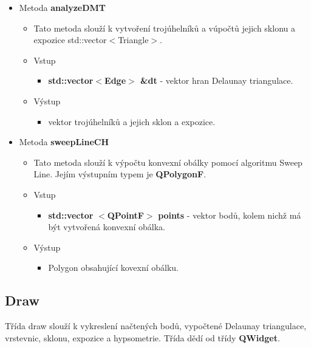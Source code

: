 \documentclass[a4paper, 12pt]{article}
\begin{document}
\begin{itemize}
	\item Metoda \textbf{analyzeDMT}		
\begin{itemize}
	\item Tato metoda slouží k vytvoření trojúhelníků a vúpočtů jejich sklonu a expozice {std::vector$<$Triangle$>$}.
	\item Vstup
	\begin{itemize}
		\item \textbf{std::vector$<$Edge$>$ \&dt} - vektor hran Delaunay triangulace.
	\end{itemize}
	\item Výstup
	\begin{itemize}	
		\item vektor trojúhelníků a jejich sklon a expozice.
	\end{itemize}
\end{itemize}

	\item Metoda \textbf{sweepLineCH}
\begin{itemize}
	\item Tato metoda slouží k výpočtu konvexní obálky pomocí algoritmu Sweep Line. Jejím výstupním typem je \textbf{QPolygonF}.
	\item Vstup
	\begin{itemize}
		\item \textbf{std::vector} $<$\textbf{QPointF}$>$ \textbf{points} - vektor bodů, kolem nichž má být vytvořená konvexní obálka.
	\end{itemize}
	\item Výstup
	\begin{itemize}
		\item Polygon obsahující kovexní obálku.
	\end{itemize} 
\end{itemize}

\end{itemize}	


\subsection{Draw}
Třída draw slouží k vykreslení načtených bodů, vypočtené Delaunay triangulace, vrstevnic, sklonu, expozice a hypsometrie. Třída dědí od třídy \textbf{QWidget}. 
\end{document}
